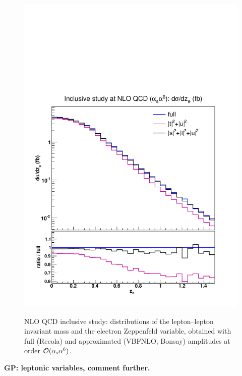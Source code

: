 \begin{figure}[hbt]
{\includegraphics[scale=0.35]{figures/scanfigures/zel_nlo.pdf}}
\caption{NLO QCD inclusive study: distributions of the lepton--lepton invariant mass and the electron Zeppenfeld variable, obtained with full ({\sc Recola}) and approximated ({\sc VBFNLO, Bonsay}) amplitudes at order $\mathcal{O}(\alpha_\text{s}\alpha^6)$.} \label{fig:mjjdyjj_1d_3}
\end{figure}
{\bf GP: leptonic variables, comment further.}


